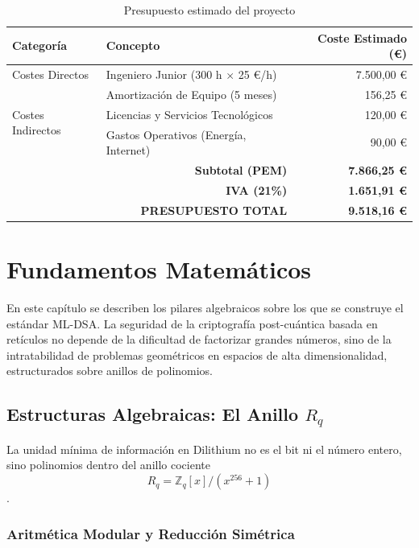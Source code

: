 \documentclass[11pt, a4paper]{report}
\theoremstyle{definition}
\begin{document}
\vspace{0.5cm}
\begin{table}[h]
\centering
\renewcommand{\arraystretch}{1.5}
\begin{tabular}{|l|l|r|}
\hline
\textbf{Categoría} & \textbf{Concepto} & \textbf{Coste Estimado (\euro{})} \\ \hline
\multirow{1}{*}{Costes Directos} 
 & Ingeniero Junior (300 h $\times$ 25 \euro{}/h) & 7.500,00 \euro{} \\ \hline
\multirow{3}{*}{Costes Indirectos} 
 & Amortización de Equipo (5 meses) & 156,25 \euro{} \\ 
 & Licencias y Servicios Tecnológicos & 120,00 \euro{} \\ 
 & Gastos Operativos (Energía, Internet) & 90,00 \euro{} \\ \hline
\multicolumn{2}{|r|}{\textbf{Subtotal (PEM)}} & \textbf{7.866,25 \euro{}} \\ \hline
\multicolumn{2}{|r|}{\textbf{IVA (21\%)}} & \textbf{1.651,91 \euro{}} \\ \hline
\multicolumn{2}{|r|}{\textbf{PRESUPUESTO TOTAL}} & \textbf{9.518,16 \euro{}} \\ \hline
\end{tabular}
\caption{Presupuesto estimado del proyecto}
\label{tab:presupuesto}
\end{table}
\vspace{0.5cm}

\chapter{Fundamentos Matemáticos}

En este capítulo se describen los pilares algebraicos sobre los que se construye el estándar ML-DSA. La seguridad de la criptografía post-cuántica basada en retículos no depende de la dificultad de factorizar grandes números, sino de la intratabilidad de problemas geométricos en espacios de alta dimensionalidad, estructurados sobre anillos de polinomios.

\section{Estructuras Algebraicas: El Anillo $R_q$}

La unidad mínima de información en Dilithium no es el bit ni el número entero, sino polinomios dentro del anillo cociente $$R_q = \mathbb{Z}_q[x]/(x^{256} + 1)$$. 

\subsection{Aritmética Modular y Reducción Simétrica}
\label{subsec:reduccion_simetrica}
\end{document}
